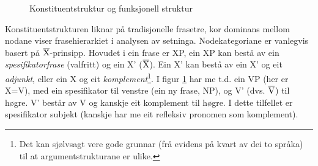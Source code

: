 \documentclass[11pt,a4paper,oneside,draft]{report}
\newcommand{\xbar}{$\rm\overline{X}$}
\newcommand{\proj}[2]{\begin{tabular}{c}\footnotesize{#1}\\\normalsize{#2}\end{tabular}}
\newcommand{\ua}{\ensuremath{\uparrow}}
\newcommand{\da}{\ensuremath{\downarrow}}
\begin{document}
 \begin{figure}[htp]
    \centering

    \caption{Konstituentstruktur og funksjonell struktur}
   \label{fig:f-og-c-struktur}
 \end{figure}

 Konstituentstrukturen liknar på tradisjonelle frasetre, kor dominans
 mellom nodane viser frasehierarkiet i analysen av
 setninga. Nodekategoriane er vanlegvis basert på
 \xbar-prinsipp. Hovudet i ein frase er XP, ein XP kan bestå av ein
 \emph{spesifikatorfrase} (valfritt) og ein X' (\xbar). Ein X' kan bestå av
 ein X' og eit \emph{adjunkt}, eller ein X og eit \emph{komplement}\footnote{Det kan sjølvsagt vere gode grunnar (frå evidens på kvart av
        dei to språka) til at argumentstrukturane er ulike. }. I
 figur \ref{fig:f-og-c-struktur} har me t.d. ein VP (her er X=V), med
 ein spesifikator til venstre (ein ny frase, NP), og V'
 (dvs. $\rm\overline{V}$) til høgre. V' består av V og kanskje eit
 komplement til høgre. I dette tilfellet er spesifikator subjekt
 (kanskje har me eit refleksiv pronomen som komplement). 
\end{document}

